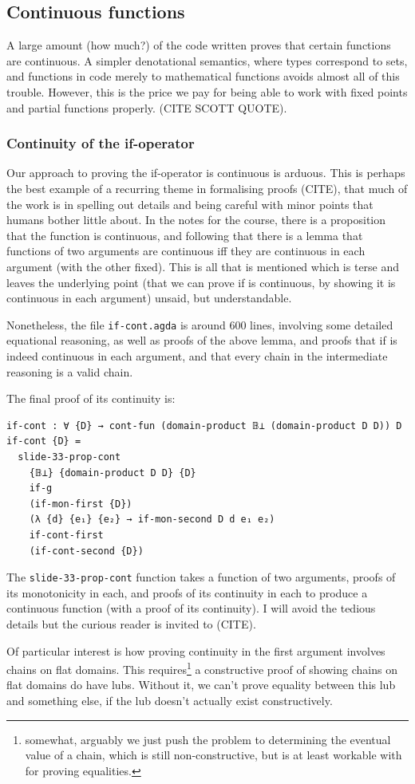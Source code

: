 \documentclass[12pt,a4paper,twoside,openright]{report}
\begin{document}
\subsection{Continuous functions}
A large amount (how much?) of the code written proves that certain functions are continuous. A simpler denotational semantics, where types correspond to sets, and functions in code merely to mathematical functions avoids almost all of this trouble. However, this is the price we pay for being able to work with fixed points and partial functions properly. (CITE SCOTT QUOTE).
\subsubsection{Continuity of the if-operator}
Our approach to proving the if-operator is continuous is arduous. This is perhaps the best example of a recurring theme in formalising proofs (CITE), that much of the work is in spelling out details and being careful with minor points that humans bother little about. In the notes for the course, there is a proposition that the function is continuous, and following that there is a lemma that functions of two arguments are continuous iff they are continuous in each argument (with the other fixed). This is all that is mentioned which is terse and leaves the underlying point (that we can prove if is continuous, by showing it is continuous in each argument) unsaid, but understandable.

Nonetheless, the file \texttt{if-cont.agda} is around 600 lines, involving some detailed equational reasoning, as well as proofs of the above lemma, and proofs that if is indeed continuous in each argument, and that every chain in the intermediate reasoning is a valid chain. 

The final proof of its continuity is:
\begin{verbatim}
if-cont : ∀ {D} → cont-fun (domain-product 𝔹⊥ (domain-product D D)) D
if-cont {D} =
  slide-33-prop-cont
    {𝔹⊥} {domain-product D D} {D}
    if-g
    (if-mon-first {D}) 
    (λ {d} {e₁} {e₂} → if-mon-second D d e₁ e₂)
    if-cont-first
    (if-cont-second {D})
\end{verbatim}
The \texttt{slide-33-prop-cont} function takes a function of two arguments, proofs of its monotonicity in each, and proofs of its continuity in each to produce a continuous function (with a proof of its continuity). I will avoid the tedious details but the curious reader is invited to (CITE).

Of particular interest is how proving continuity in the first argument involves chains on flat domains. This requires\footnote{somewhat, arguably we just push the problem to determining the eventual value of a chain, which is still non-constructive, but is at least workable with for proving equalities.} a constructive proof of showing chains on flat domains do have lubs. Without it, we can't prove equality between this lub and something else, if the lub doesn't actually exist constructively. 
\end{document}

